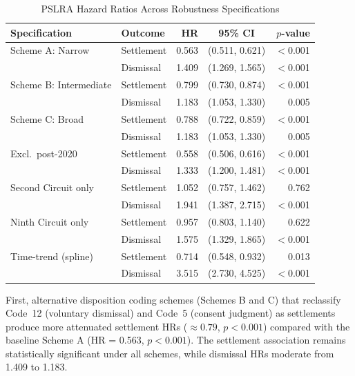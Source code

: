 \begin{table}[htb]
\centering
\caption{PSLRA Hazard Ratios Across Robustness Specifications}
\label{tab:robustness}
\renewcommand{\arraystretch}{1.2}
\begin{tabular*}{\textwidth}{@{\extracolsep{\fill}} l l r c r @{}}
\toprule
\textbf{Specification} & \textbf{Outcome} & \textbf{HR} & \textbf{95\% CI} & \textbf{$p$-value} \\
\midrule
Scheme A: Narrow        & Settlement & 0.563 & (0.511, 0.621) & $<$0.001 \\
                        & Dismissal  & 1.409 & (1.269, 1.565) & $<$0.001 \\
\addlinespace[0.5em]
Scheme B: Intermediate  & Settlement & 0.799 & (0.730, 0.874) & $<$0.001 \\
                        & Dismissal  & 1.183 & (1.053, 1.330) & 0.005 \\
\addlinespace[0.5em]
Scheme C: Broad          & Settlement & 0.788 & (0.722, 0.859) & $<$0.001 \\
                        & Dismissal  & 1.183 & (1.053, 1.330) & 0.005 \\
\addlinespace[0.5em]
Excl.\ post-2020        & Settlement & 0.558 & (0.506, 0.616) & $<$0.001 \\
                        & Dismissal  & 1.333 & (1.200, 1.481) & $<$0.001 \\
\addlinespace[0.5em]
Second Circuit only     & Settlement & 1.052 & (0.757, 1.462) & 0.762    \\
                        & Dismissal  & 1.941 & (1.387, 2.715) & $<$0.001 \\
\addlinespace[0.5em]
Ninth Circuit only      & Settlement & 0.957 & (0.803, 1.140) & 0.622    \\
                        & Dismissal  & 1.575 & (1.329, 1.865) & $<$0.001 \\
\addlinespace[0.5em]
Time-trend (spline)     & Settlement & 0.714 & (0.548, 0.932) & 0.013    \\
                        & Dismissal  & 3.515 & (2.730, 4.525) & $<$0.001 \\
\bottomrule
\end{tabular*}
\end{table}

First, alternative disposition coding schemes (Schemes B and C) that reclassify Code~12 (voluntary dismissal) and Code~5 (consent
judgment) as settlements produce more attenuated settlement HRs ($\approx 0.79$, $p < 0.001$) compared with the baseline Scheme A (HR = 0.563, $p < 0.001$). The settlement association remains statistically significant under all schemes, while dismissal HRs moderate from 1.409 to 1.183.

